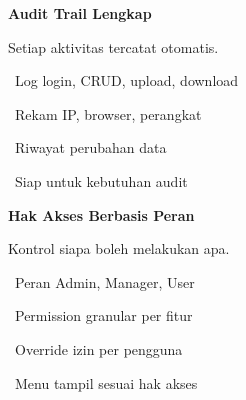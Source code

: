 \documentclass[a4paper]{article}
\begin{document}
\vspace{8pt}

\noindent
\begin{minipage}[t]{0.485\textwidth}
    \colorbox{PurplePrimary}{%
        \begin{minipage}{\dimexpr\textwidth-2\fboxsep\relax}
            {\fontsize{10}{13}\selectfont\bfseries\color{White} Audit Trail Lengkap}
        \end{minipage}}\par
    \vspace{4pt}
    {\fontsize{9}{12}\selectfont\color{TextDark}%
    Setiap aktivitas tercatat otomatis.\par\vspace{3pt}
    \textbullet\ Log login, CRUD, upload, download\par\vspace{2pt}%
    \textbullet\ Rekam IP, browser, perangkat\par\vspace{2pt}%
    \textbullet\ Riwayat perubahan data\par\vspace{2pt}%
    \textbullet\ Siap untuk kebutuhan audit}%

\end{minipage}%
\hfill
\begin{minipage}[t]{0.485\textwidth}
    \colorbox{BlueDark}{%
        \begin{minipage}{\dimexpr\textwidth-2\fboxsep\relax}
            {\fontsize{10}{13}\selectfont\bfseries\color{White} Hak Akses Berbasis Peran}
        \end{minipage}}\par
    \vspace{4pt}
    {\fontsize{9}{12}\selectfont\color{TextDark}%
    Kontrol siapa boleh melakukan apa.\par\vspace{3pt}
    \textbullet\ Peran Admin, Manager, User\par\vspace{2pt}%
    \textbullet\ Permission granular per fitur\par\vspace{2pt}%
    \textbullet\ Override izin per pengguna\par\vspace{2pt}%
    \textbullet\ Menu tampil sesuai hak akses}%

\end{minipage}

\vspace{8pt}
\end{document}
